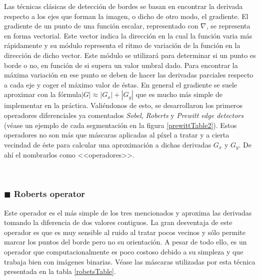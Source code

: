 Las t\'{e}cnicas cl\'{a}sicas de detecci\'{o}n de bordes se basan en encontrar la derivada respecto a los ejes que forman la imagen, o dicho de otro modo, el gradiente. El gradiente de un punto de una funci\'{o}n escalar, representado con $\nabla$, se representa en forma vectorial. Este vector indica la direcci\'{o}n en la cual la funci\'{o}n varia m\'{a}s r\'{a}pidamente y su m\'{o}dulo representa el ritmo de variaci\'{o}n de la funci\'{o}n en la direcci\'{o}n de dicho vector. Este m\'{o}dulo se utilizar\'{a} para determinar si un punto es borde o no, en funci\'{o}n de si supera un valor umbral dado. Para encontrar la m\'{a}xima variaci\'{o}n en ese punto se deben de hacer las derivadas parciales respecto a cada eje y coger el m\'{a}ximo valor de \'{e}stas. En general el gradiente se suele aproximar con la f\'{o}rmula\protect\footnotemark {}$|G| \approx |G_x| + |G_y| $  que es mucho m\'{a}s simple de implementar en la pr\'{a}ctica. Vali\'{e}ndonos de esto, se desarrollaron los primeros operadores diferenciales ya comentados  \textit{Sobel}, \textit{Roberts} y \textit{Prewitt edge detectors} (v\'{e}ase un ejemplo de cada segmentaci\'{o}n en la figura \ref{prewittTable2}). Estos operadores no son m\'{a}s que m\'{a}scaras aplicadas al p\'{i}xel a tratar y a cierta vecindad de \'{e}ste para calcular una aproximaci\'{o}n a dichas derivadas $G_x$ y $G_y$. De ah\'{i} el nombrarlos como <<operadores>>.

\

\subsubsection{$\blacksquare$ \quad Roberts operator}

Este operador es el m\'{a}s simple de los tres mencionados y aproxima las derivadas tomando la diferencia de dos valores contiguos. La gran desventaja de este operador es que es muy sensible al ruido al tratar pocos vecinos y s\'{o}lo permite marcar los puntos del borde pero no su orientaci\'{o}n. A pesar de todo ello, es un operador que computacionalmente es poco costoso debido a su simpleza y que trabaja bien con im\'{a}genes binarias. V\'{e}ase las m\'{a}scaras utilizadas por esta t\'{e}cnica presentada en la tabla \ref{robetsTable}. 

